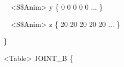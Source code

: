 \documentclass[a4paper]{article}
\newcommand\textstyleOOoComputerKeyWord[1]{\textrm{\textcolor[rgb]{0.0,0.0,0.5019608}{#1}}}
\newcommand\textstyleOOoAssemblerSpecialChar[1]{\textrm{\textcolor[rgb]{0.0,0.5019608,0.0}{#1}}}
\newcommand\textstyleOOoAssemblerIdent[1]{\textrm{\textcolor{black}{#1}}}
\newcommand\textstyleOOoAssemblerLiteral[1]{\textrm{\textcolor[rgb]{0.49803922,0.0,0.49803922}{#1}}}
\begin{document}
{\color{black}
\textstyleOOoComputerKeyWord{\textcolor{black}{\ \ \ \ \ \ \ \ \ \ }}\textstyleOOoAssemblerSpecialChar{{\textless}}\textstyleOOoAssemblerIdent{S}\textstyleOOoAssemblerSpecialChar{\$}\textstyleOOoAssemblerIdent{Anim}\textstyleOOoAssemblerSpecialChar{{\textgreater}}\textstyleOOoComputerKeyWord{\textcolor{black}{
}}\textstyleOOoAssemblerIdent{y}\textstyleOOoComputerKeyWord{\textcolor{black}{
}}\textstyleOOoAssemblerSpecialChar{\{}\textstyleOOoComputerKeyWord{\textcolor{black}{
}}\textstyleOOoAssemblerLiteral{0}\textstyleOOoComputerKeyWord{\textcolor{black}{
}}\textstyleOOoAssemblerLiteral{0}\textstyleOOoComputerKeyWord{\textcolor{black}{
}}\textstyleOOoAssemblerLiteral{0}\textstyleOOoComputerKeyWord{\textcolor{black}{
}}\textstyleOOoAssemblerLiteral{0}\textstyleOOoComputerKeyWord{\textcolor{black}{
}}\textstyleOOoAssemblerLiteral{0}\textstyleOOoComputerKeyWord{\textcolor{black}{
}}\textstyleOOoAssemblerIdent{...}\textstyleOOoComputerKeyWord{\textcolor{black}{
}}\textstyleOOoAssemblerSpecialChar{\}}}

{\color{black}
\textstyleOOoComputerKeyWord{\textcolor{black}{\ \ \ \ \ \ \ \ \ \ }}\textstyleOOoAssemblerSpecialChar{{\textless}}\textstyleOOoAssemblerIdent{S}\textstyleOOoAssemblerSpecialChar{\$}\textstyleOOoAssemblerIdent{Anim}\textstyleOOoAssemblerSpecialChar{{\textgreater}}\textstyleOOoComputerKeyWord{\textcolor{black}{
}}\textstyleOOoAssemblerIdent{z}\textstyleOOoComputerKeyWord{\textcolor{black}{
}}\textstyleOOoAssemblerSpecialChar{\{}\textstyleOOoComputerKeyWord{\textcolor{black}{
}}\textstyleOOoAssemblerLiteral{20}\textstyleOOoComputerKeyWord{\textcolor{black}{
}}\textstyleOOoAssemblerLiteral{20}\textstyleOOoComputerKeyWord{\textcolor{black}{
}}\textstyleOOoAssemblerLiteral{20}\textstyleOOoComputerKeyWord{\textcolor{black}{
}}\textstyleOOoAssemblerLiteral{20}\textstyleOOoComputerKeyWord{\textcolor{black}{
}}\textstyleOOoAssemblerLiteral{20}\textstyleOOoComputerKeyWord{\textcolor{black}{
}}\textstyleOOoAssemblerIdent{...}\textstyleOOoComputerKeyWord{\textcolor{black}{
}}\textstyleOOoAssemblerSpecialChar{\}}}

{\color{black}
\textstyleOOoComputerKeyWord{\textcolor{black}{\ \ \ \ \ \ \ \ }}\textstyleOOoAssemblerSpecialChar{\}}}

{\color{black}
\textstyleOOoComputerKeyWord{\textcolor{black}{\ \ \ \ \ \ \ \ }}\textstyleOOoAssemblerSpecialChar{{\textless}}\textstyleOOoAssemblerIdent{Table}\textstyleOOoAssemblerSpecialChar{{\textgreater}}\textstyleOOoComputerKeyWord{\textcolor{black}{
}}\textstyleOOoAssemblerIdent{JOINT\_B}\textstyleOOoComputerKeyWord{\textcolor{black}{
}}\textstyleOOoAssemblerSpecialChar{\{}}
\end{document}
